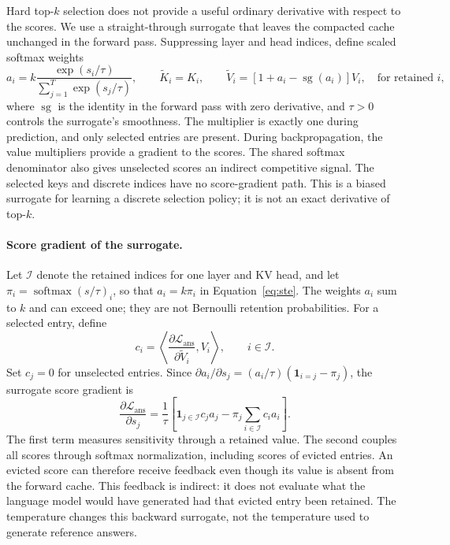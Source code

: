 Hard top-$k$ selection does not provide a useful ordinary derivative with respect to the scores. We use a straight-through surrogate \citep{bengio2013straightthrough} that leaves the compacted cache unchanged in the forward pass. Suppressing layer and head indices, define scaled softmax weights
\begin{equation}
    a_i=k\frac{\exp(s_i/\tau)}{\sum_{j=1}^{T}\exp(s_j/\tau)},\qquad
    \widetilde{K}_i=K_i,\qquad
    \widetilde{V}_i=\left[1+a_i-\operatorname{sg}(a_i)\right]V_i,
    \quad\text{for retained }i,
    \label{eq:ste}
\end{equation}
where $\operatorname{sg}$ is the identity in the forward pass with zero derivative, and $\tau>0$ controls the surrogate's smoothness. The multiplier is exactly one during prediction, and only selected entries are present. During backpropagation, the value multipliers provide a gradient to the scores. The shared softmax denominator also gives unselected scores an indirect competitive signal. The selected keys and discrete indices have no score-gradient path. This is a biased surrogate for learning a discrete selection policy; it is not an exact derivative of top-$k$.

\paragraph{Score gradient of the surrogate.}
Let $\mathcal{I}$ denote the retained indices for one layer and KV head, and let $\pi_i=\operatorname{softmax}(s/\tau)_i$, so that $a_i=k\pi_i$ in Equation~\ref{eq:ste}. The weights $a_i$ sum to $k$ and can exceed one; they are not Bernoulli retention probabilities. For a selected entry, define
\begin{equation}
    c_i=\left\langle\frac{\partial\mathcal{L}_{\mathrm{ans}}}{\partial\widetilde{V}_i},V_i\right\rangle,
    \qquad i\in\mathcal{I}.
\end{equation}
Set $c_j=0$ for unselected entries. Since $\partial a_i/\partial s_j=(a_i/\tau)(\mathbf{1}_{i=j}-\pi_j)$, the surrogate score gradient is
\begin{equation}
    \frac{\partial\mathcal{L}_{\mathrm{ans}}}{\partial s_j}
    =\frac{1}{\tau}\left[
    \mathbf{1}_{j\in\mathcal{I}}c_j a_j
    -\pi_j\sum_{i\in\mathcal{I}}c_i a_i\right].
    \label{eq:scoregradient}
\end{equation}
The first term measures sensitivity through a retained value. The second couples all scores through softmax normalization, including scores of evicted entries. An evicted score can therefore receive feedback even though its value is absent from the forward cache. This feedback is indirect: it does not evaluate what the language model would have generated had that evicted entry been retained. The temperature changes this backward surrogate, not the temperature used to generate reference answers.


